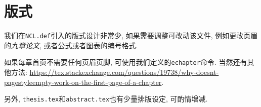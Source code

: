 \chapter{版式}

  我们在\texttt{NCL.def}引入的版式设计非常少, 如果需要调整可改动该文件,
例如更改页眉的\emph{九章论文}, 或者公式或者图表的编号格式.

  如果每章首页不需要任何页眉页脚, 可使用我们定义的\texttt{echapter}命令.
当然还有其他方法: \url{https://tex.stackexchange.com/questions/19738/why-doesnt-pagestyleempty-work-on-the-first-page-of-a-chapter}.

  另外, \texttt{thesis.tex}和\texttt{abstract.tex}也有少量排版设定, 可酌情增减.

